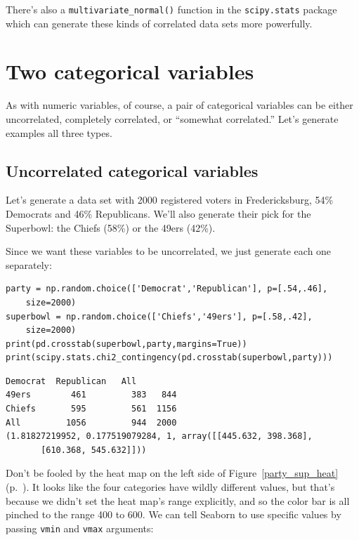 There's also a \texttt{multivariate\_normal()} function in the
\texttt{scipy.stats} package which can generate these kinds of correlated data
sets more powerfully.


\section{Two categorical variables}


As with numeric variables, of course, a pair of categorical variables can be
either uncorrelated, completely correlated, or ``somewhat correlated.''
Let's generate examples all three types.


\subsection{Uncorrelated categorical variables}

Let's generate a data set with 2000 registered voters in Fredericksburg, 54\%
Democrats and 46\% Republicans. We'll also generate their pick for the
Superbowl: the Chiefs (58\%) or the 49ers (42\%).

Since we want these variables to be uncorrelated, we just generate each one
separately:

\begin{Verbatim}[fontsize=\footnotesize,samepage=true,frame=single,framesep=3mm]
party = np.random.choice(['Democrat','Republican'], p=[.54,.46],
    size=2000)
superbowl = np.random.choice(['Chiefs','49ers'], p=[.58,.42],
    size=2000)
print(pd.crosstab(superbowl,party,margins=True))
print(scipy.stats.chi2_contingency(pd.crosstab(superbowl,party))) 
\end{Verbatim}
\vspace{-.2in}

\begin{Verbatim}[fontsize=\footnotesize,samepage=true,frame=leftline,framesep=5mm,framerule=1mm]
        Democrat  Republican   All
49ers        461         383   844
Chiefs       595         561  1156
All         1056         944  2000
(1.81827219952, 0.177519079284, 1, array([[445.632, 398.368],
       [610.368, 545.632]]))
\end{Verbatim}


Don't be fooled by the heat map on the left side of Figure~\ref{party_sup_heat}
(p.~\pageref{party_sup_heat}). It looks like the four categories have wildly
different values, but that's because we didn't set the heat map's range
explicitly, and so the color bar is all pinched to the range 400 to 600. We can
tell Seaborn to use specific values by passing \texttt{vmin} and \texttt{vmax}
arguments:


